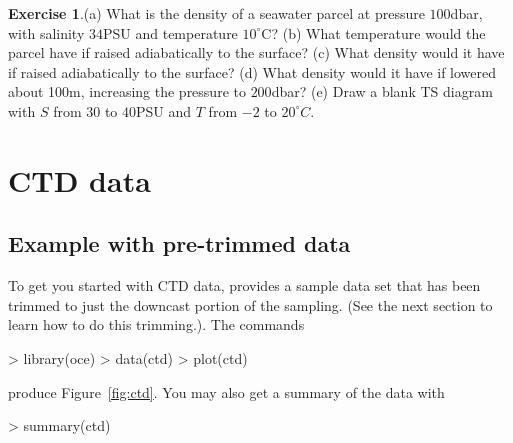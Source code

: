 \documentclass{article}
\newcommand{\workedexercise}[2]{
	\vspace{1ex}
	\begin{boxedminipage}[c]{0.95\linewidth}
		{\textbf{Exercise #1}.\hspace{1em}#2}
	\end{boxedminipage}
	\vspace{1ex}
}
\begin{document}
\workedexercise{1}{(a) What is the density of a seawater parcel at pressure
$100$dbar, with salinity $34$PSU and temperature $10^\circ$C?
(b) What temperature would the parcel have if raised adiabatically to the surface?
(c) What density would it have if raised adiabatically to the surface?
(d) What density would it have if lowered about 100m, increasing the pressure to $200$dbar?
(e) Draw a blank TS diagram with $S$ from $30$ to $40$PSU and $T$ from $-2$ to $20^\circ C$.
}


\section{CTD data}
\subsection{Example with pre-trimmed data}

To get you started with CTD data, \verb@oce@ provides a sample data set that has been trimmed to just the downcast portion of the sampling.  (See the next section to learn how to do this trimming.).  The commands
\begin{Schunk}
\begin{Sinput}
> library(oce)
> data(ctd)
> plot(ctd)
\end{Sinput}
\end{Schunk}
produce Figure~\ref{fig:ctd}. You may also get a summary of the data with
\begin{Schunk}
\begin{Sinput}
> summary(ctd)
\end{Sinput}
\end{Schunk}
\end{document}
